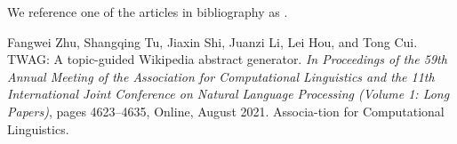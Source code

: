 \documentclass[oneside]{book}
\begin{document}
We reference one of the articles in bibliography as \cite{twag_2023ACL}.

\begin{thebibliography}{99} %
 Fangwei Zhu, Shangqing Tu, Jiaxin Shi, Juanzi Li, Lei Hou, and Tong Cui. TWAG: A topic-guided Wikipedia abstract generator. \emph{In Proceedings of the 59th Annual Meeting of the Association for Computational Linguistics and the 11th International Joint Conference on Natural Language Processing (Volume 1: Long Papers)}, pages 4623–4635, Online, August 2021. Associa-tion for Computational Linguistics.
\end{thebibliography}
\end{document}
